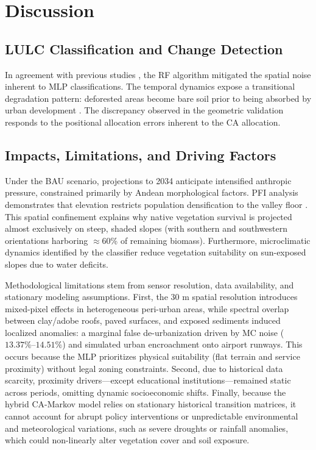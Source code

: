 \documentclass[runningheads]{llncs}
\begin{document}
\section{Discussion}
\label{sec:discussion}

\subsection{LULC Classification and Change Detection}
In agreement with previous studies \cite{014_NileEtiopia}, the RF algorithm mitigated the spatial noise inherent to MLP classifications. The temporal dynamics expose a transitional degradation pattern: deforested areas become bare soil prior to being absorbed by urban development \cite{018_rolRFcrecimiento}. The discrepancy observed in the geometric validation responds to the positional allocation errors inherent to the CA allocation.

\subsection{Impacts, Limitations, and Driving Factors}
Under the BAU scenario, projections to 2034 anticipate intensified anthropic pressure, constrained primarily by Andean morphological factors. PFI analysis demonstrates that elevation restricts population densification to the valley floor \cite{570_Lukas_Ethiopia}. This spatial confinement explains why native vegetation survival is projected almost exclusively on steep, shaded slopes (with southern and southwestern orientations harboring $\approx$60\% of remaining biomass). Furthermore, microclimatic dynamics identified by the classifier reduce vegetation suitability on sun-exposed slopes due to water deficits.

Methodological limitations stem from sensor resolution, data availability, and stationary modeling assumptions. First, the $30\text{ m}$ spatial resolution introduces mixed-pixel effects in heterogeneous peri-urban areas, while spectral overlap between clay/adobe roofs, paved surfaces, and exposed sediments \cite{233_img_ndbi_y_reflec_bandas} induced localized anomalies: a marginal false de-urbanization driven by MC noise ($13.37\%\text{--}14.51\%$) and simulated urban encroachment onto airport runways. This occurs because the MLP prioritizes physical suitability (flat terrain and service proximity) without legal zoning constraints. Second, due to historical data scarcity, proximity drivers---except educational institutions---remained static across periods, omitting dynamic socioeconomic shifts. Finally, because the hybrid CA-Markov model relies on stationary historical transition matrices, it cannot account for abrupt policy interventions or unpredictable environmental and meteorological variations, such as severe droughts or rainfall anomalies, which could non-linearly alter vegetation cover and soil exposure. 
\end{document}
